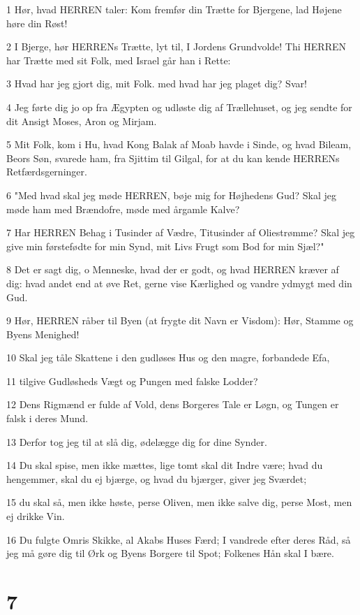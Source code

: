 \par 1 Hør, hvad HERREN taler: Kom fremfør din Trætte for Bjergene, lad Højene høre din Røst!
\par 2 I Bjerge, hør HERRENs Trætte, lyt til, I Jordens Grundvolde! Thi HERREN har Trætte med sit Folk, med Israel går han i Rette:
\par 3 Hvad har jeg gjort dig, mit Folk. med hvad har jeg plaget dig? Svar!
\par 4 Jeg førte dig jo op fra Ægypten og udløste dig af Trællehuset, og jeg sendte for dit Ansigt Moses, Aron og Mirjam.
\par 5 Mit Folk, kom i Hu, hvad Kong Balak af Moab havde i Sinde, og hvad Bileam, Beors Søn, svarede ham, fra Sjittim til Gilgal, for at du kan kende HERRENs Retfærdsgerninger.
\par 6 "Med hvad skal jeg møde HERREN, bøje mig for Højhedens Gud? Skal jeg møde ham med Brændofre, møde med årgamle Kalve?
\par 7 Har HERREN Behag i Tusinder af Vædre, Titusinder af Oliestrømme? Skal jeg give min førstefødte for min Synd, mit Livs Frugt som Bod for min Sjæl?"
\par 8 Det er sagt dig, o Menneske, hvad der er godt, og hvad HERREN kræver af dig: hvad andet end at øve Ret, gerne vise Kærlighed og vandre ydmygt med din Gud.
\par 9 Hør, HERREN råber til Byen (at frygte dit Navn er Visdom): Hør, Stamme og Byens Menighed!
\par 10 Skal jeg tåle Skattene i den gudløses Hus og den magre, forbandede Efa,
\par 11 tilgive Gudløsheds Vægt og Pungen med falske Lodder?
\par 12 Dens Rigmænd er fulde af Vold, dens Borgeres Tale er Løgn, og Tungen er falsk i deres Mund.
\par 13 Derfor tog jeg til at slå dig, ødelægge dig for dine Synder.
\par 14 Du skal spise, men ikke mættes, lige tomt skal dit Indre være; hvad du hengemmer, skal du ej bjærge, og hvad du bjærger, giver jeg Sværdet;
\par 15 du skal så, men ikke høste, perse Oliven, men ikke salve dig, perse Most, men ej drikke Vin.
\par 16 Du fulgte Omris Skikke, al Akabs Huses Færd; I vandrede efter deres Råd, så jeg må gøre dig til Ørk og Byens Borgere til Spot; Folkenes Hån skal I bære.

\chapter{7}

